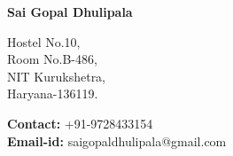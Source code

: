 \documentclass[a4paper]{article}
\begin{document}
\begin{LARGE}
       \begin{center}
         \textrm{\textbf{Sai Gopal Dhulipala}}
       \end{center} 
     \noindent\makebox[\linewidth]{\rule{\paperwidth}{0.4pt}}
   \end{LARGE}
   \begin{Large}

     \begin{minipage}[t]{0.5\textwidth}
        Hostel No.10,\\
        Room No.B-486,\\
        NIT Kurukshetra,\\
        Haryana-136119.
     \end{minipage}
     \begin{minipage}[t]{0.5\textwidth}
        \textbf{Contact:} +91-9728433154\\
        \textbf{Email-id:} saigopaldhulipala@gmail.com
     \end{minipage}
   \end{Large}
\end{document}
